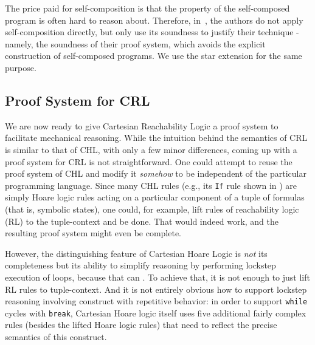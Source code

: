 The price paid for self-composition is that the property of the self-composed program is often hard to reason about.
Therefore, in~\cite{SousaD16}, the authors do not apply self-composition directly, but only use its soundness to justify
their technique - namely, the soundness of their proof system, which avoids the explicit construction
of self-composed programs.
We use the star extension for the same purpose.



\subsection{Proof System for CRL}
\label{sec:proof-system}

We are now ready to give Cartesian Reachability Logic a proof system to
facilitate mechanical reasoning.  While the intuition behind the semantics of
CRL is similar to that of CHL, with only a few minor differences, coming up
with a proof system for CRL is not straightforward.  One could attempt to reuse the proof
system of CHL and modify it \emph{somehow} to be independent of the particular
programming language.  Since many CHL rules (e.g., its \texttt{If} rule shown
in ) are simply Hoare logic rules acting on a particular
component of a tuple of formulas (that is, symbolic states), one could, for
example, lift rules of reachability logic (RL) to the tuple-context and be
done.  That would indeed work, and the resulting proof system might even be
complete.

However, the distinguishing feature of Cartesian Hoare Logic is \emph{not} its
completeness but its ability to simplify reasoning by performing lockstep
execution of loops, because that can .
To achieve that, it is not enough to 
just lift RL rules to tuple-context. And it is not entirely obvious how
to support lockstep reasoning involving construct with repetitive behavior: in
order to support \texttt{while} cycles with \texttt{break}, Cartesian Hoare logic itself uses
five additional fairly complex rules (besides the lifted Hoare logic rules) 
that need to reflect the precise semantics of this construct.

